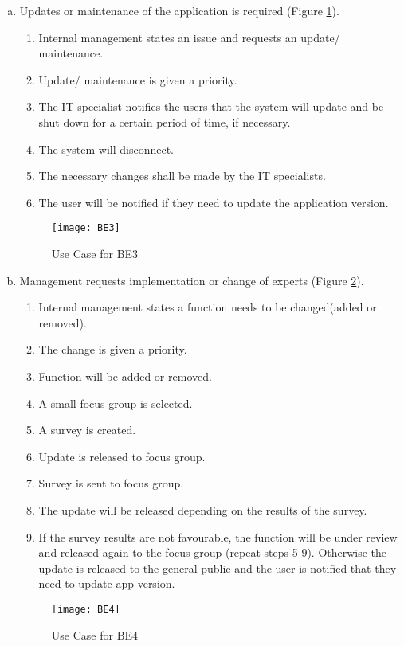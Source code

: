 \documentclass[titlepage]{article}
\begin{document}
\begin{enumerate}[a)]
	\item Updates or maintenance of the application is required (Figure \ref{usecase:updates}).
		\begin{enumerate}[{BE3}.1]
			\item Internal management states an issue and requests an update/ maintenance.
			\item Update/ maintenance is given a priority.
			\item The IT specialist notifies the users that the system will update and be shut down for a certain period of time, if necessary.
			\item The system will disconnect.
			\item The necessary changes shall be made by the IT specialists.
			\item The user will be notified if they need to update the application version.
		\end{enumerate}
	\begin{center}
		\begin{figure}[H]
			\texttt{[image: BE3]}
			\caption{Use Case for BE3}\label{usecase:updates}
		\end{figure}
	\end{center}
	
	\item Management requests implementation or change of experts (Figure \ref{usecase:change_expert}).
		\begin{enumerate}[{BE4}.1]
			\item Internal management states a function needs to be changed(added or removed).
			\item The change is given a priority.
			\item Function will be added or removed.
			\item A small focus group is selected.
			\item A survey is created.
			\item Update is released to focus group.
			\item Survey is sent to focus group.
			\item The update will be released depending on the results of the survey.
			\item If the survey results are not favourable, the function will be under review and released again to the focus group (repeat steps 5-9). Otherwise the update is released to the general public and the user is notified that they need to update app version.
		\end{enumerate}
	\begin{center}
		\begin{figure}[h!]
			\texttt{[image: BE4]}
			\caption{Use Case for BE4}\label{usecase:change_expert}
		\end{figure}
	\end{center}


\end{enumerate}
\end{document}
